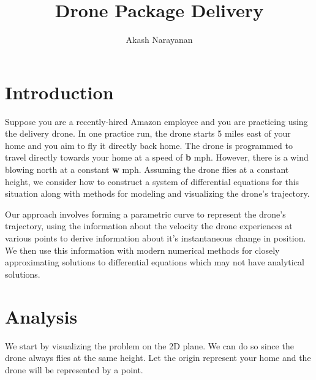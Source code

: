 \documentclass{article}
\title{Drone Package Delivery}
\author{Akash Narayanan}
\date{}
\begin{document}
    \maketitle

    \section{Introduction}
    Suppose you are a recently-hired Amazon employee and you are practicing
    using the delivery drone. In one practice run, the drone starts 5 miles east
    of your home and you aim to fly it directly back home. The drone is
    programmed to travel directly towards your home at a speed of \textbf{b}
    mph. However, there is a wind blowing north at a constant \textbf{w} mph.
    Assuming the drone flies at a constant height, we consider how to construct
    a system of differential equations for this situation along with methods for
    modeling and visualizing the drone's trajectory.

    Our approach involves forming a parametric curve to represent the drone's
    trajectory, using the information about the velocity the drone experiences
    at various points to derive information about it's instantaneous change in
    position. We then use this information with modern numerical methods for
    closely approximating solutions to differential equations which may not have
    analytical solutions.

    \section{Analysis}
    We start by visualizing the problem on the 2D plane. We can do so since the
    drone always flies at the same height. Let the origin represent your home
    and the drone will be represented by a point.

    \begin{figure}[h]
        \centering
    \end{figure}
\end{document}
